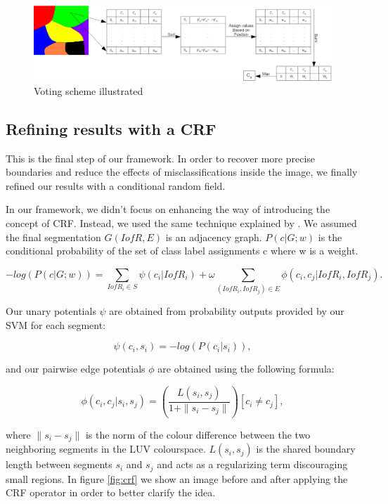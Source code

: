 \documentclass[twoside,11pt]{article}
\begin{document}
\begin{figure}
\includegraphics[scale =.4]{./Figures/votation.eps}
\centering
\caption{Voting scheme illustrated}
\label{fig:votation}
\end{figure}

\subsection{Refining results with a CRF}

This is the final step of our framework. In order to recover more precise boundaries
and reduce the effects of misclassifications inside the image, we finally refined
our results with a conditional random field.

In our framework, we didn't focus on enhancing the way of introducing the concept
of CRF. Instead, we used the same technique explained by \cite{fulkerson09class}.
We assumed the final segmentation $G(IofR, E)$ is an adjacency graph.
$P(c|G;w)$ is the conditional probability of the set of class label assignments c
where w is a weight.

\begin{equation}
-log(P(c|G;w)) = \sum_{IofR_i\in{S}}{\psi(c_i|IofR_i)} + \omega{\sum_{(IofR_i, IofR_j)\in{E}}{\phi(c_i,c_j|IofR_i,IofR_j)}}.
\end{equation}

Our unary potentials $\psi$ are obtained from probability outputs provided
by our SVM for each segment:

\[
\psi(c_i,s_i) = -log(P(c_i|s_i)),
\]

and our pairwise edge potentials $\phi$ are obtained using the following formula:

\[
\phi(c_i,c_j|s_i,s_j) = (\frac{L(s_i,s_j)}{1 + \parallel{s_i} - s_j\parallel})[c_i\neq{c_j}],
\]

where $\parallel{s_i} - s_j\parallel$ is the norm of the colour difference
between the two neighboring segments in the LUV colourspace. $L(s_i,s_j)$
is the shared boundary length between segments $s_i$ and $s_j$ and acts as
a regularizing term discouraging small regions. In figure \ref{fig:crf} we show an image
before and after applying the CRF operator in order to better clarify the idea.
\end{document}
